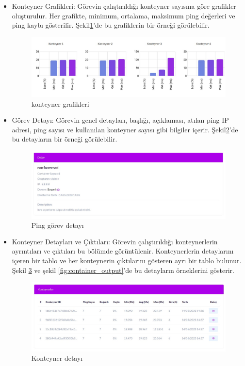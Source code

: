 \begin{itemize}
	\item Konteyner Grafikleri: Görevin çalıştırıldığı konteyner sayısına göre grafikler oluşturulur. Her grafikte, minimum, ortalama, maksimum ping değerleri ve ping kaybı gösterilir. Şekil\ref{fig:container_graphic}'de bu grafiklerin bir örneği görülebilir.
	      \begin{figure}[ht]
		      \centering
		      \includegraphics[width=0.9\linewidth]{images/ping_graphic.jpeg}
		      \caption{konteyner grafikleri}
		      \label{fig:container_graphic}
	      \end{figure}

	\item Görev Detayı: Görevin genel detayları, başlığı, açıklaması, atılan ping IP adresi, ping sayısı ve kullanılan konteyner sayısı gibi bilgiler içerir. Şekil\ref{fig:ping_detail}'de bu detayların bir örneği görülebilir.
	      \begin{figure}[ht]
		      \centering
		      \includegraphics[width=0.9\linewidth]{images/ping_detail.jpeg}
		      \caption{Ping görev detayı}
		      \label{fig:ping_detail}
	      \end{figure}

	\item Konteyner Detayları ve Çıktıları: Görevin çalıştırıldığı konteynerlerin ayrıntıları ve çıktıları bu bölümde görüntülenir. Konteynerlerin detaylarını içeren bir tablo ve her konteynerin çıktılarını gösteren ayrı bir tablo bulunur. Şekil \ref{fig:container_detail} ve şekil \ref{fig:container_output}'de bu detayların örneklerini gösterir.
	      \begin{figure}[ht]
		      \centering
		      \includegraphics[width=0.9\linewidth]{images/container_detail.jpeg}
		      \caption{Konteyner detayı}
		      \label{fig:container_detail}
	      \end{figure}


\end{itemize}
